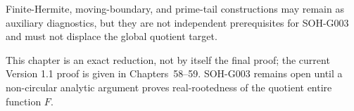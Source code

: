Finite-Hermite, moving-boundary, and prime-tail constructions may remain as auxiliary diagnostics, but they are not independent prerequisites for SOH-G003 and must not displace the global quotient target.

\begin{warning}
This chapter is an exact reduction, not by itself the final proof; the current Version 1.1 proof is given in Chapters~58--59. SOH-G003 remains open until a non-circular analytic argument proves real-rootedness of the quotient entire function $F$.
\end{warning}
